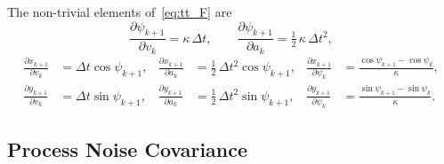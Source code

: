 The non-trivial elements of~\eqref{eq:tt_F} are
\begin{equation}
    \frac{\partial\psi_{k+1}}{\partial v_k} = \kappa\,\Delta t,
    \qquad
    \frac{\partial\psi_{k+1}}{\partial a_k} = \tfrac{1}{2}\,\kappa\,\Delta t^2,
\end{equation}
\begin{equation}
    \renewcommand{\arraystretch}{2}
    \begin{aligned}
        \frac{\partial x_{k+1}}{\partial v_k} &= \Delta t\cos\psi_{k+1}, &
        \frac{\partial x_{k+1}}{\partial a_k} &= \tfrac{1}{2}\,\Delta t^2\cos\psi_{k+1}, &
        \frac{\partial x_{k+1}}{\partial \psi_k} &= \frac{\cos\psi_{k+1} - \cos\psi_k}{\kappa}, \\
        \frac{\partial y_{k+1}}{\partial v_k} &= \Delta t\sin\psi_{k+1}, &
        \frac{\partial y_{k+1}}{\partial a_k} &= \tfrac{1}{2}\,\Delta t^2\sin\psi_{k+1}, &
        \frac{\partial y_{k+1}}{\partial \psi_k} &= \frac{\sin\psi_{k+1} - \sin\psi_k}{\kappa}.
    \end{aligned}
\end{equation}

\subsection*{Process Noise Covariance}

